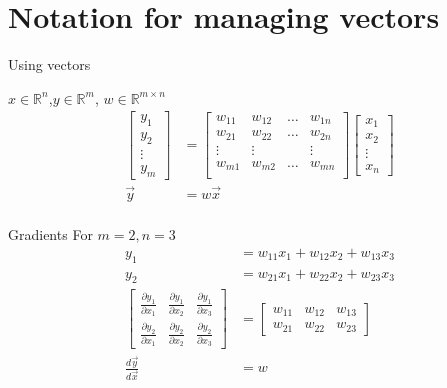 \section{Notation for managing vectors}
\begin{frame}{Using vectors}
		\begin{block}{$x \in \mathbb{R}^n$,$y \in \mathbb{R}^m$, $w\in \mathbb{R}^{m \times n}$}
			\begin{align*}
				\begin{bmatrix}
					y_1 \\
					y_2 \\
					\vdots \\
					y_m
				\end{bmatrix} & =  
				\begin{bmatrix}
					w_{11} & w_{12}& \dots & w_{1n}  \\
					w_{21} & w_{22}& \dots & w_{2n}  \\
					\vdots &\vdots &  & \vdots  \\
					w_{m1} & w_{m2}& \dots & w_{mn}  \\
				\end{bmatrix}
			\begin{bmatrix}
				x_1 \\
				x_2 \\
				\vdots \\
				x_n
			\end{bmatrix} \\
		\vec{y} &=w\vec{x} \\
			\end{align*}

		\end{block}
\end{frame}
\begin{frame}{Gradients}
	For $m=2, n=3$
	\begin{align}
		y_1 &= w_{11}x_1 + w_{12}x_2+w_{13}x_3  \\
		y_2 &= w_{21}x_1 + w_{22}x_2+w_{23}x_3  \\ 
		\begin{bmatrix}
			\frac{\partial y_1}{\partial x_1} & 
				\frac{\partial y_1}{\partial x_2}& 
				\frac{\partial y_1}{\partial x_3}  \\
			\frac{\partial y_2}{\partial x_1}  & 
				\frac{\partial y_2}{\partial x_2}  & 
				\frac{\partial y_2}{\partial x_3}  
		\end{bmatrix} &= 
		\begin{bmatrix}
			w_{11} &  w_{12} & 	w_{13} \\
			w_{21} &  w_{22} & 	w_{23} 
		\end{bmatrix} \\
		\frac{d\vec{y}}{d\vec{x}} &=w 
	\end{align}
\end{frame}
